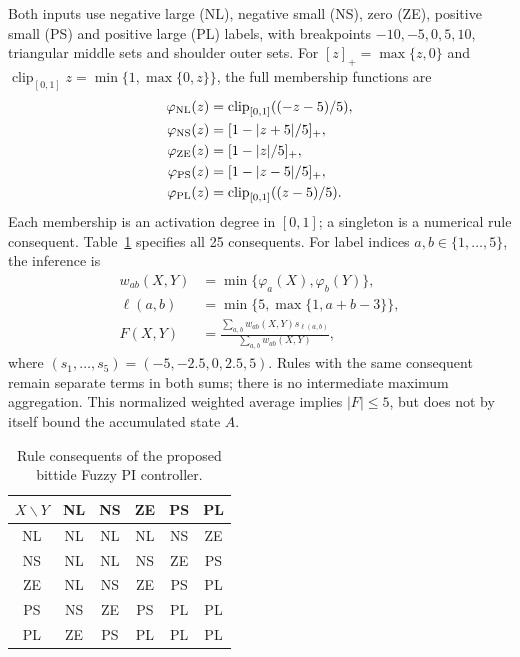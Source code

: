 Both inputs use negative large (NL), negative small (NS), zero (ZE), positive small (PS) and positive large (PL) labels, with breakpoints
$-10,-5,0,5,10$, triangular middle sets and shoulder outer sets.
For $[z]_+=\max\{z,0\}$ and
$\operatorname{clip}_{[0,1]}z=\min\{1,\max\{0,z\}\}$, the full
membership functions are
\begin{align}
 \varphi_{\rm NL}(z)&=\operatorname{clip}_{[0,1]}((-z-5)/5),\nonumber\\
 \varphi_{\rm NS}(z)&=[1-|z+5|/5]_+,\nonumber\\
 \varphi_{\rm ZE}(z)&=[1-|z|/5]_+,\nonumber\\
 \varphi_{\rm PS}(z)&=[1-|z-5|/5]_+,\nonumber\\
 \varphi_{\rm PL}(z)&=\operatorname{clip}_{[0,1]}((z-5)/5).
 \label{eq:fpi_full_memberships}
\end{align}
Each membership is an activation degree in $[0,1]$; a singleton is a
numerical rule consequent. Table~\ref{tab:fpi_full_rules} specifies all
25 consequents. For label indices $a,b\in\{1,\ldots,5\}$, the inference is
\begin{align}
 w_{ab}(X,Y)&=\min\{\varphi_a(X),\varphi_b(Y)\},\nonumber\\
 \ell(a,b)&=\min\{5,\max\{1,a+b-3\}\},\nonumber\\
 F(X,Y)&=\frac{\sum_{a,b}w_{ab}(X,Y)s_{\ell(a,b)}}
                   {\sum_{a,b}w_{ab}(X,Y)},
 \label{eq:fpi_rules}
\end{align}
where $(s_1,\ldots,s_5)=(-5,-2.5,0,2.5,5)$. Rules with the same
consequent remain separate terms in both sums; there is no intermediate
maximum aggregation. This normalized weighted average implies $|F|\le5$,
but does not by itself bound the accumulated state $A$.

\begin{table}[t]
\caption{Rule consequents of the proposed bittide Fuzzy PI controller.}
\label{tab:fpi_full_rules}
\centering
\begin{tabular}{@{}c|ccccc@{}}\toprule
$X\backslash Y$ & NL & NS & ZE & PS & PL\\\midrule
NL & NL & NL & NL & NS & ZE\\
NS & NL & NL & NS & ZE & PS\\
ZE & NL & NS & ZE & PS & PL\\
PS & NS & ZE & PS & PL & PL\\
PL & ZE & PS & PL & PL & PL\\\bottomrule
\end{tabular}
\end{table}

